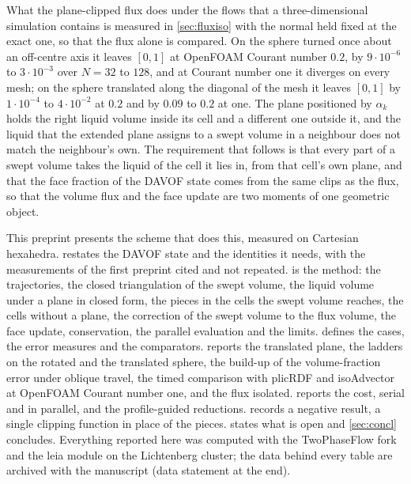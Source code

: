 \documentclass[preprint,12pt]{elsarticle}
\begin{document}
What the plane-clipped flux does under the flows that a three-dimensional simulation contains is measured in \cref{sec:fluxiso} with the normal held fixed at the exact one, so that the flux alone is compared. On the sphere turned once about an off-centre axis it leaves $[0, 1]$ at OpenFOAM Courant number $0.2$, by $9\cdot10^{-6}$ to $3\cdot10^{-3}$ over $N = 32$ to $128$, and at Courant number one it diverges on every mesh; on the sphere translated along the diagonal of the mesh it leaves $[0, 1]$ by $1\cdot10^{-4}$ to $4\cdot10^{-2}$ at $0.2$ and by $0.09$ to $0.2$ at one. The plane positioned by $\alpha_k$ holds the right liquid volume inside its cell and a different one outside it, and the liquid that the extended plane assigns to a swept volume in a neighbour does not match the neighbour's own. The requirement that follows is that every part of a swept volume takes the liquid of the cell it lies in, from that cell's own plane, and that the face fraction of the DAVOF state comes from the same clips as the flux, so that the volume flux and the face update are two moments of one geometric object.

This preprint presents the scheme that does this, measured on Cartesian hexahedra.  restates the DAVOF state and the identities it needs, with the measurements of the first preprint cited and not repeated.  is the method: the trajectories, the closed triangulation of the swept volume, the liquid volume under a plane in closed form, the pieces in the cells the swept volume reaches, the cells without a plane, the correction of the swept volume to the flux volume, the face update, conservation, the parallel evaluation and the limits.  defines the cases, the error measures and the comparators.  reports the translated plane, the ladders on the rotated and the translated sphere, the build-up of the volume-fraction error under oblique travel, the timed comparison with plicRDF and isoAdvector at OpenFOAM Courant number one, and the flux isolated.  reports the cost, serial and in parallel, and the profile-guided reductions.  records a negative result, a single clipping function in place of the pieces.  states what is open and \cref{sec:concl} concludes. Everything reported here was computed with the TwoPhaseFlow fork \citep{TwoPhaseFlowFork2026} and the leia module \citep{LeiaRepo2026} on the Lichtenberg cluster; the data behind every table are archived with the manuscript (data statement at the end).
\end{document}
